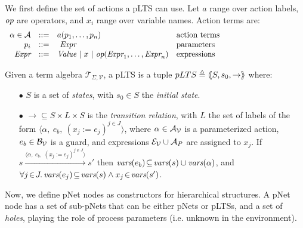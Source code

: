 \documentclass[smallcondensed]{svjour3}
\newcommand{\noteSB}[2][color=green!40, size=\tiny]{\todo[#1]{{\bf
      Note: } {#2}}}
\newcommand{\cT}{\ensuremath{\mathcal{T}}}
\newcommand{\cV}{\ensuremath{\mathcal{V}}}
\newcommand{\signature}{\ensuremath{\Sigma}}
\newcommand{\variables}{\ensuremath{\cV}}
\newcommand{\Talg}{\ensuremath{\cT_{\signature,\variables}}}
\def\AlgE{\mathcal{E}}
\def\AlgA{\mathcal{A}}
\def\AlgB{\mathcal{B}}
\begin{document}
We first define the set of actions a pLTS can use.  Let $a$
range over action labels, $\symb{op}$ are operators, and $x_i$ range over
variable names. Action terms are:
\[
\begin{array}[l]{rcl@{\quad}p{5.5cm}}
  \alpha\in\AlgA&::=&a(p_1,\ldots,p_n)&\text{action terms}\\
  p_i&::=& ~\symb{Expr}&\text{parameters}\\
  \symb{Expr}&::=& \symb{Value}~|~x~|~\symb{op}(\symb{Expr}_1,\dots,\symb{Expr}_n)&\text{expressions}
\end{array}
\]

\begin{definition}[pLTS]
\label{pLTS}
Given a term algebra $\Talg$, a pLTS is a tuple
$pLTS\triangleq\langle\hspace{-0.58ex}\langle S,s_0, \to\rangle\hspace{-0.58ex}\rangle$ where:
\begin{itemize}
\item[$\bullet$]
$S$ is a set of \emph{states}, with $s_0 \in S$ the \emph{initial state}.
\item[$\bullet$] $\to \subseteq S \times L \times S$ is the \emph{transition relation}, with
$L$ the set of labels of the form
$\langle \alpha,~e_b,~(x_j\!:= {e}_j)^{j\in J}\rangle$,
  where $\alpha \in\AlgA_{\P}$ is a parameterized action,
    $e_b \in \AlgB_{\P}$ is a guard, and
    expressions  $\AlgE_{\P}\cup\AlgA_{P}$ are assigned to $x_j$.
If 
$s \xrightarrow{\langle \alpha,~e_b,~(x_j\!:= {e}_j)^{j\in
		J}\rangle} s'$ then 
                $\vars(e_b)\!\subseteq\! \vars(s)\cup\vars(\alpha)$, and
		$\forall j\!\in\! J .\,\vars(e_j)\!\subseteq\! \vars(s)\land 
x_j\!\in\!\vars(s')$.
\end{itemize}
\end{definition}

Now, we define
pNet nodes as constructors for hierarchical structures.
A pNet node has a set of sub-pNets that can be either pNets or pLTSs, and a
set of \emph{holes}, playing the role of process parameters
(i.e. unknown in the environment).
\end{document}
